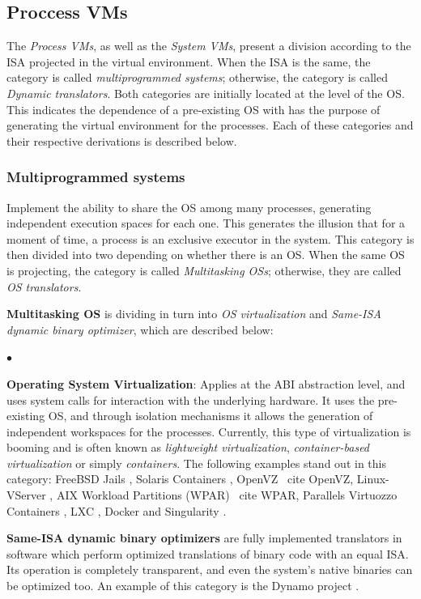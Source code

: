 	\subsection{Proccess VMs}
	
	The \textit{Process VMs}, as well as the \textit{System VMs}, present a division according to the ISA projected in the virtual environment. When the ISA is the same, the category is called \textit{multiprogrammed systems}; otherwise, the category is called \textit{Dynamic translators}. Both categories are initially located at the level of the OS. This indicates the dependence of a pre-existing OS with has the purpose of generating the virtual environment for the processes. Each of these categories and their respective derivations is described below.
	
	\subsubsection{Multiprogrammed systems}
	
	Implement the ability to share the OS among many processes, generating independent execution spaces for each one. This generates the illusion that for a moment of time, a process is an exclusive executor in the system. This category is then divided into two depending on whether there is an OS. When the same OS is projecting, the category is called \textit{Multitasking OSs}; otherwise, they are called \textit{OS translators}.
	
	\textbf {Multitasking OS} is dividing in turn into \textit{OS virtualization} and \textit{Same-ISA dynamic binary optimizer}, which are described below:
		
	\begin{list}{$\bullet$}{\setlength{\leftmargin}{5pt}}
	
		\item \textbf{Operating System Virtualization}: Applies at the ABI abstraction level, and uses system calls for interaction with the underlying hardware. It uses the pre-existing OS, and through isolation mechanisms it allows the generation of independent workspaces for the processes. Currently, this type of virtualization is booming and is often known as \textit {lightweight virtualization}, \textit{container-based virtualization} or simply \textit{containers}. The following examples stand out in this category: FreeBSD Jails \cite {Biederman2006}, Solaris Containers \cite {SolarisZones}, OpenVZ \ cite {OpenVZ}, Linux-VServer \cite {Linux-VServer}, AIX Workload Partitions (WPAR) \ cite {WPAR}, Parallels Virtuozzo Containers \cite {Virtuozzo}, LXC \cite {LXC}, Docker \cite {Docker} and Singularity \cite {Sylabs.io}.
			
		\item \textbf{Same-ISA dynamic binary optimizers} are fully implemented translators in software which perform optimized translations of binary code with an equal ISA. Its operation is completely transparent, and even the system's native binaries can be optimized too. An example of this category is the Dynamo project \cite{Bala2011}.
	\end{list}
		
